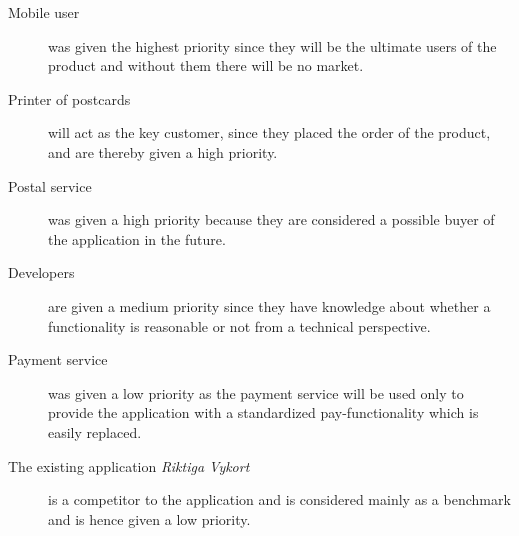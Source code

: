 \documentclass[10pt,a4paper]{article}
\begin{document}
\begin{description}
\item[Mobile user] was given the highest priority since they will be the ultimate users of the product and without them there will be no market.
\item[Printer of postcards] will act as the key customer, since they placed the order of the product, and are thereby given a high priority. 
\item[Postal service] was given a high priority because they are considered a possible buyer of the application in the future. 
\item[Developers] are given a medium priority since they have knowledge about whether a functionality is reasonable or not from a technical perspective.
\item[Payment service] was given a low priority as the payment service will be used only to provide the application with a standardized pay-functionality which is easily replaced.
\item[The existing application \textit{Riktiga Vykort}]  is a competitor to the application and is considered mainly as a benchmark and is hence given a low priority. 

\end{description}
\end{document}
